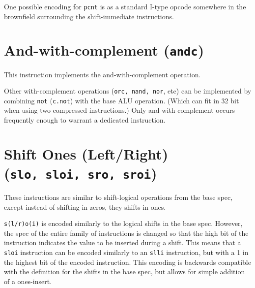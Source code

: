 



One possible encoding for \texttt{pcnt} is as a standard I-type opcode somewhere
in the brownfield surrounding the shift-immediate instructions.


\section{And-with-complement (\texttt{andc})}

This instruction implements the and-with-complement operation.



Other with-complement operations ({\tt orc, nand, nor}, etc) can be implemented
by combining {\tt not} ({\tt c.not}) with the base ALU operation. (Which can
fit in 32 bit when using two compressed instructions.) Only and-with-complement
occurs frequently enough to warrant a dedicated instruction.



%
%
%


\section{Shift Ones (Left/Right) (\texttt{slo,\ sloi,\ sro,\ sroi})}

These instructions are similar to shift-logical operations from the base
spec, except instead of shifting in zeros, they shifts in ones.





\texttt{s(l/r)o(i)} is encoded similarly to the logical shifts in the
base spec. However, the spec of the entire family of instructions is
changed so that the high bit of the instruction indicates the value to
be inserted during a shift. This means that a \texttt{sloi} instruction
can be encoded similarly to an \texttt{slli} instruction, but with a 1
in the highest bit of the encoded instruction. This encoding is
backwards compatible with the definition for the shifts in the base
spec, but allows for simple addition of a ones-insert.

